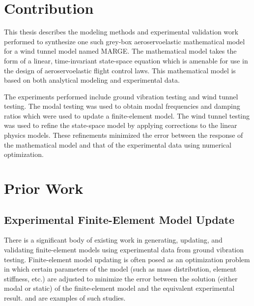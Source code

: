 \section{Contribution}

This thesis describes the modeling methods and experimental validation work performed to synthesize one such grey-box aeroservoelastic mathematical model for a wind tunnel model named MARGE. The mathematical model takes the form of a linear, time-invariant state-space equation which is amenable for use in the design of aeroservoelastic flight control laws. This mathematical model is based on both analytical modeling and experimental data.

The experiments performed include ground vibration testing and wind tunnel testing. The modal testing was used to obtain modal frequencies and damping ratios which were used to update a finite-element model. The wind tunnel testing was used to refine the state-space model by applying corrections to the linear physics models. These refinements minimized the error between the response of the mathematical model and that of the experimental data using numerical optimization.

\section{Prior Work} %

\subsection{Experimental Finite-Element Model Update} %

There is a significant body of existing work in generating, updating, and validating finite-element models using experimental data from ground vibration testing. Finite-element model updating is often posed as an optimization problem in which certain parameters of the model (such as mass distribution, element stiffness, etc.) are adjusted to minimize the error between the solution (either modal or static) of the finite-element model and the equivalent experimental result. \cite{Chen1980} and \cite{Pak2023} are examples of such studies.

